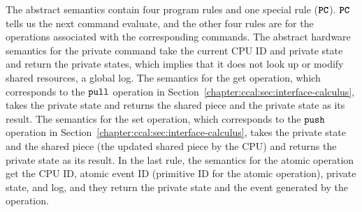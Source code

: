 The abstract semantics contain 
four program rules and one special rule (${{\mathrm{\texttt{\textbf{PC}}}}}$). 
${{\mathrm{\texttt{\textbf{PC}}}}}$ tells us the next command evaluate, 
and the other four rules are for the operations associated with the corresponding commands.
The abstract hardware semantics for the private command take the current CPU ID and private state and return the private states, which implies that 
it does not look up or modify shared resources, a global log.
The semantics for the get operation, which corresponds to the ${\mathrm{\texttt{pull}}}$ operation in Section~\ref{chapter:ccal:sec:interface-calculus}, takes the private state and returns the shared piece and the private state as its result. 
The semantics for the set operation,  which corresponds to the ${\mathrm{\texttt{push}}}$ operation in Section~\ref{chapter:ccal:sec:interface-calculus}, takes the private state and the shared piece (the updated shared piece by the CPU) and returns the private state as its result. 
In the last rule, the semantics for the atomic operation get the CPU ID,  atomic event ID (primitive ID for the atomic operation), 
 private state, and  log, and they return the private state and the event generated by the operation. 



